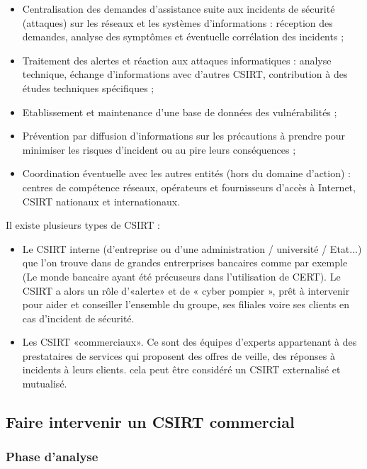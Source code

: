 \begin{itemize}
  \item Centralisation des demandes d’assistance suite aux incidents de sécurité (attaques) sur les réseaux et les systèmes d’informations : réception des demandes, analyse des symptômes et éventuelle corrélation des incidents ;
  \item Traitement des alertes et réaction aux attaques informatiques : analyse technique, échange d’informations avec d’autres CSIRT, contribution à des études techniques spécifiques ;
  \item Etablissement et maintenance d’une base de données des vulnérabilités ;
  \item Prévention par diffusion d’informations sur les précautions à prendre pour minimiser les risques d’incident ou au pire leurs conséquences ;
  \item Coordination éventuelle avec les autres entités (hors du domaine d’action) : centres de compétence réseaux, opérateurs et fournisseurs d’accès à Internet, CSIRT nationaux et internationaux.
\end{itemize}

Il existe plusieurs types de CSIRT :

\begin{itemize}
  \item  Le CSIRT interne (d’entreprise ou d’une administration / université / Etat...) que l'on trouve dans de grandes entrerprises bancaires comme par exemple (Le monde bancaire ayant été précuseurs dans l'utilisation de CERT). Le CSIRT a alors un rôle d’«alerte» et de « cyber pompier », prêt à intervenir pour aider et conseiller l’ensemble du groupe, ses filiales voire ses clients en cas d’incident de sécurité.
  \item  Les CSIRT «commerciaux». Ce sont des équipes d’experts appartenant à des prestataires de services qui  proposent des offres de veille, des réponses à incidents à leurs clients. cela peut être  considéré  un CSIRT externalisé et mutualisé.
\end{itemize}
 
 \subsection{Faire intervenir un CSIRT commercial}
 \subsubsection{Phase d'analyse}

